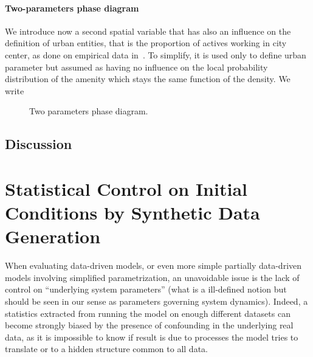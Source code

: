 \paragraph{Two-parameters phase diagram}

We introduce now a second spatial variable that has also an influence on the definition of urban entities, that is the proportion of actives working in city center, as done on empirical data in~\cite{cottineau2015scaling}. To simplify, it is used only to define urban parameter but assumed as having no influence on the local probability distribution of the amenity which stays the same function of the density. We write 


\begin{figure}
\centering

\caption{Two parameters phase diagram.}
\label{fig:two-params}
\end{figure}



\subsection{Discussion}














\newpage




\section{Statistical Control on Initial Conditions by Synthetic Data Generation}


When evaluating data-driven models, or even more simple partially data-driven models involving simplified parametrization, an unavoidable issue is the lack of control on ``underlying system parameters'' (what is a ill-defined notion but should be seen in our sense as parameters governing system dynamics). Indeed, a statistics extracted from running the model on enough different datasets can become strongly biased by the presence of confounding in the underlying real data, as it is impossible to know if result is due to processes the model tries to translate or to a hidden structure common to all data.

